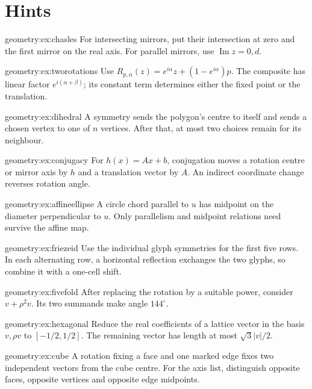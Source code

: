 \section{Hints}

\begin{hint}{geometry:ex:chasles}
For intersecting mirrors, put their intersection at zero and the first mirror on the real axis. For parallel mirrors, use $\operatorname{Im}z=0,d$.
\end{hint}
\begin{hint}{geometry:ex:tworotations}
Use $R_{p,\alpha}(z)=e^{i\alpha}z+(1-e^{i\alpha})p$. The composite has linear factor $e^{i(\alpha+\beta)}$; its constant term determines either the fixed point or the translation.
\end{hint}
\begin{hint}{geometry:ex:dihedral}
A symmetry sends the polygon's centre to itself and sends a chosen vertex to one of $n$ vertices. After that, at most two choices remain for its neighbour.
\end{hint}
\begin{hint}{geometry:ex:conjugacy}
For $h(x)=Ax+b$, conjugation moves a rotation centre or mirror axis by $h$ and a translation vector by $A$. An indirect coordinate change reverses rotation angle.
\end{hint}
\begin{hint}{geometry:ex:affineellipse}
A circle chord parallel to $u$ has midpoint on the diameter perpendicular to $u$. Only parallelism and midpoint relations need survive the affine map.
\end{hint}
\begin{hint}{geometry:ex:friezeid}
Use the individual glyph symmetries for the first five rows. In each alternating row, a horizontal reflection exchanges the two glyphs, so combine it with a one-cell shift.
\end{hint}
\begin{hint}{geometry:ex:fivefold}
After replacing the rotation by a suitable power, consider $v+\rho^2v$. Its two summands make angle $144^\circ$.
\end{hint}
\begin{hint}{geometry:ex:hexagonal}
Reduce the real coefficients of a lattice vector in the basis $v,\rho v$ to $[-1/2,1/2]$. The remaining vector has length at most $\sqrt3|v|/2$.
\end{hint}
\begin{hint}{geometry:ex:cube}
A rotation fixing a face and one marked edge fixes two independent vectors from the cube centre. For the axis list, distinguish opposite faces, opposite vertices and opposite edge midpoints.
\end{hint}
